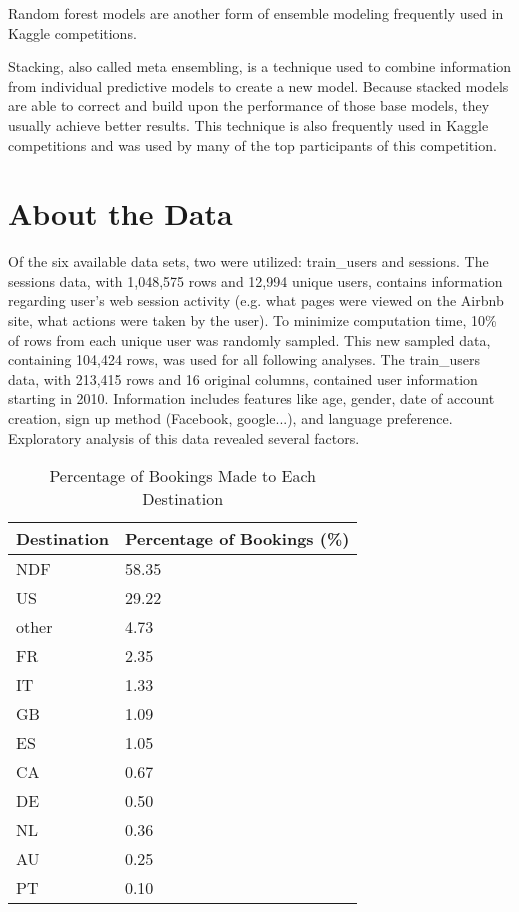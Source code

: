 \documentclass{article}
\begin{document}
Random forest models are another form of ensemble modeling frequently used in Kaggle competitions. 

Stacking, also called meta ensembling, is a technique used to combine information from individual predictive 
models to create a new model. Because stacked models are able to correct and build upon the performance of those
base models, they usually achieve better results. This technique is also frequently used in Kaggle competitions
and was used by many of the top participants of this competition. 


\section{About the Data}

Of the six available data sets, two were utilized: train\_users and sessions. The sessions data, with 1,048,575 rows and 12,994 unique users, contains information regarding user's web session activity (e.g. what pages were viewed on the Airbnb site, what actions were taken by the user). To minimize computation time, 10\% of rows from each unique user was randomly sampled. This new sampled data, containing 104,424 rows, was used for all following analyses. The train\_users data, with 213,415 rows and 16 original columns, contained user information starting in 2010. Information includes features like age, gender, date of account creation, sign up method (Facebook, google...), and language preference. Exploratory analysis of this data revealed several factors. 

\begin{table}[ht]
\centering
\begin{tabular}{| l |l |}
  \hline
  \textbf{Destination} & \textbf{Percentage of Bookings (\%)} \\ 
  \hline
  NDF & 58.35 \\ 
  US & 29.22 \\ 
  other & 4.73 \\ 
  FR & 2.35 \\ 
  IT & 1.33 \\ 
  GB & 1.09 \\ 
  ES & 1.05 \\ 
  CA & 0.67 \\ 
  DE & 0.50 \\ 
  NL & 0.36 \\ 
  AU & 0.25 \\ 
  PT & 0.10 \\ 
   \hline
\end{tabular}
\caption{Percentage of Bookings Made to Each Destination}
\label{table:countries}
\end{table}
\end{document}
